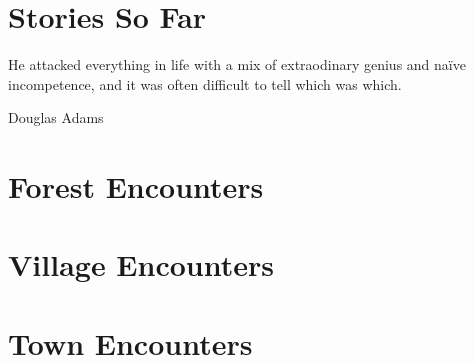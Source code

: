 \documentclass[a4paper,openany]{book}
\begin{document}
\chapter{Stories So Far}
	\epigraph{He attacked everything in life with a mix of extraodinary genius and na\"ive incompetence, and it was often difficult to tell which was which.}{Douglas Adams}



\chapter{Forest Encounters}

\newcommand{\lescounter}{\addtocounter{enc}{-1}}



\chapter{Village Encounters}



\chapter{Town Encounters}





\printglossary

\printindex
\end{document}

